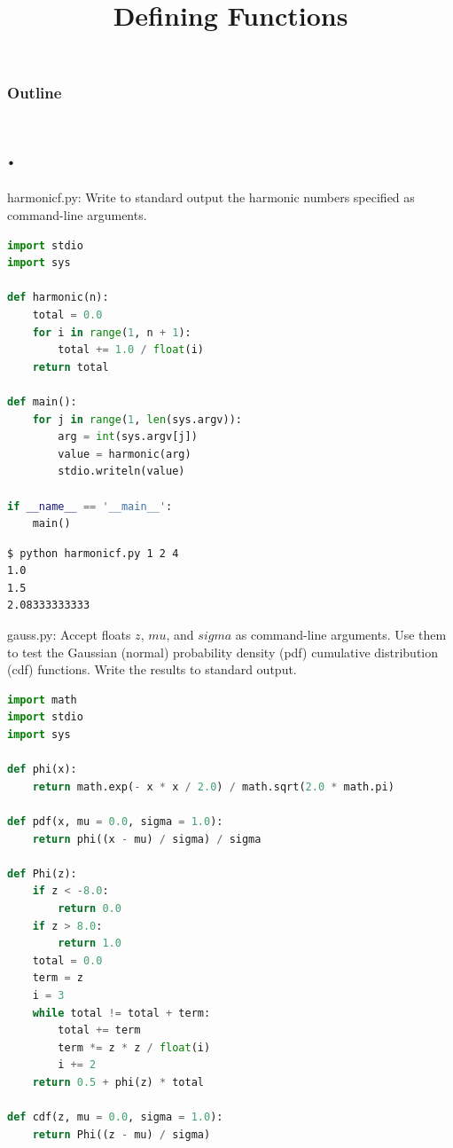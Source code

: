 \documentclass[8pt,a4paper,compress,handout]{beamer}
\title{Defining Functions}
\date{}
\begin{document}
\begin{frame}
\vfill
\titlepage
\end{frame}

\begin{frame}
\frametitle{Outline}
\tableofcontents
\end{frame}

\section{.}
\begin{frame}[fragile]
\begin{framed}
\tiny harmonicf.py:  Write to standard output the harmonic numbers specified as command-line arguments.
\end{framed}

\begin{lstlisting}[language=Python]
import stdio
import sys

def harmonic(n):
    total = 0.0
    for i in range(1, n + 1):
        total += 1.0 / float(i)
    return total

def main():
    for j in range(1, len(sys.argv)):
        arg = int(sys.argv[j])
        value = harmonic(arg)
        stdio.writeln(value)

if __name__ == '__main__':
    main()
\end{lstlisting}

\begin{lstlisting}[language={}]
$ python harmonicf.py 1 2 4
1.0
1.5
2.08333333333
\end{lstlisting}
\end{frame}

\begin{frame}[fragile]
\begin{framed}
\tiny gauss.py: Accept floats $z$, $mu$, and $sigma$ as command-line arguments. Use them to test the Gaussian (normal) probability density (pdf) cumulative distribution (cdf) functions. Write the results to standard output.
\end{framed}

\begin{lstlisting}[language=Python]
import math
import stdio
import sys

def phi(x):
    return math.exp(- x * x / 2.0) / math.sqrt(2.0 * math.pi)

def pdf(x, mu = 0.0, sigma = 1.0):
    return phi((x - mu) / sigma) / sigma

def Phi(z):
    if z < -8.0:
        return 0.0
    if z > 8.0:
        return 1.0
    total = 0.0
    term = z
    i = 3
    while total != total + term:
        total += term
        term *= z * z / float(i)
        i += 2
    return 0.5 + phi(z) * total

def cdf(z, mu = 0.0, sigma = 1.0):
    return Phi((z - mu) / sigma)
\end{lstlisting}
\end{frame}
\end{document}
